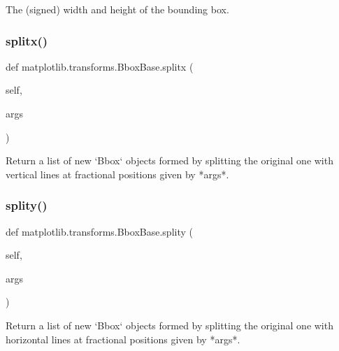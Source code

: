 \begin{DoxyVerb}The (signed) width and height of the bounding box.\end{DoxyVerb}
 \mbox{\label{classmatplotlib_1_1transforms_1_1BboxBase_a1ed34decfc9b1907eb70fa58238c92d1}} 
\subsubsection{\texorpdfstring{splitx()}{splitx()}}
{\footnotesize\ttfamily def matplotlib.\+transforms.\+Bbox\+Base.\+splitx (\begin{DoxyParamCaption}\item[{}]{self,  }\item[{}]{args }\end{DoxyParamCaption})}

\begin{DoxyVerb}Return a list of new `Bbox` objects formed by splitting the original
one with vertical lines at fractional positions given by *args*.
\end{DoxyVerb}
 \mbox{\label{classmatplotlib_1_1transforms_1_1BboxBase_a62c520887c5aa295c1be4c6773bfe84a}} 
\subsubsection{\texorpdfstring{splity()}{splity()}}
{\footnotesize\ttfamily def matplotlib.\+transforms.\+Bbox\+Base.\+splity (\begin{DoxyParamCaption}\item[{}]{self,  }\item[{}]{args }\end{DoxyParamCaption})}

\begin{DoxyVerb}Return a list of new `Bbox` objects formed by splitting the original
one with horizontal lines at fractional positions given by *args*.
\end{DoxyVerb}
 \mbox{\label{classmatplotlib_1_1transforms_1_1BboxBase_a5044b5b4541d90c222898fc842975bab}} 

